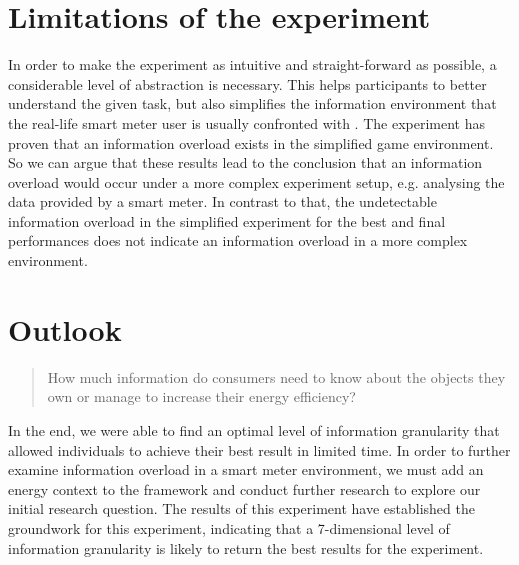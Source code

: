 \section{Limitations of the experiment}
In order to make the experiment as intuitive and straight-forward as possible, a considerable level of abstraction is necessary. This helps participants to better understand the given task, but also simplifies the information environment that the real-life smart meter user is usually confronted with \citep{Jacoby1984}. The experiment has proven that an information overload exists in the simplified game environment.  So we can argue that these results lead to the conclusion that an information overload would occur under a more complex experiment setup, e.g. analysing the data provided by a smart meter. 
In contrast to that, the undetectable information overload in the simplified experiment for the best and final performances does not indicate an information overload in a more complex environment.

\section{Outlook}
\begin{quote}
How much information do consumers need to know about the objects they own or manage to increase their energy efficiency?
\end{quote}
In the end, we were able to find an optimal level of information granularity that allowed individuals to achieve their best result in limited time. In order to further examine information overload in a smart meter environment, we must add an energy context to the framework and conduct further research to explore our initial research question.
The results of this experiment have established the groundwork for this experiment, indicating that a 7-dimensional level of information granularity is likely to return the best results for the experiment.

